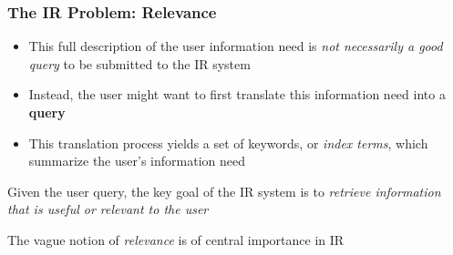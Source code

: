 \documentclass[svgnames]{beamer}
\begin{document}
\begin{frame}
    \frametitle{The IR Problem: Relevance}

    \begin{itemize}

    \item This full description of the user information need is \emph{not
          necessarily a good query} to be submitted to the IR system
    \item Instead, the user might want to first translate this information need
        into a \alert{\textbf{query}}
    \item This translation process yields a set of keywords, or \emph{index
          terms}, which summarize the user's information need
    \end{itemize}

    \begin{block}{}
        Given the user query, the key goal of the IR system is to
        \emph{retrieve information that is useful or relevant to the user}
    \end{block}

    The vague notion of \emph{relevance} is of central importance in IR
    
\end{frame}




\end{document}
